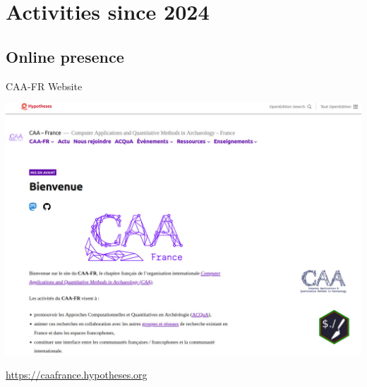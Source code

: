 \documentclass[xcolor=dvipsnames, 10pt, french, american]{beamer}
\begin{document}
\section{Activities since 2024}
\frame{\tableofcontents[sectionstyle=show/shaded, subsectionstyle=show/hide/hide]}
 

\subsection{Online presence}
\frame{\tableofcontents[sectionstyle=show/shaded, subsectionstyle=show/shaded/hide]}
 
 
\begin{frame}
	\begin{block}{CAA-FR Website}
        \begin{center}
            \includegraphics[height=0.6\textheight]{figures/caa-fr-website}
        \end{center}
        \url{https://caafrance.hypotheses.org}
	\end{block}
\end{frame}
\end{document}
